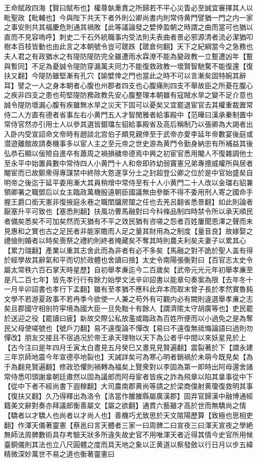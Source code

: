 王命賦政四海【賢曰賦布也】權尊埶重責之所歸若不平心災眚必至誠宜審擇其人以毗聖政【毗輔也】今與陛下共天下者外則公卿尚書内則常侍黄門譬猶一門之内一家之事安則共其福慶危則通其禍敗【此等議論發之嬖倖盈朝之時謂之曲而當可也猶以直而不見容嗚呼】刺史二千石外統職事内受法則夫表曲者景必邪源清者流必潔猶叩樹本百枝皆動也由此言之本朝號令豈可蹉跌【蹉倉何翻】天下之紀綱當今之急務也夫人君之有政猶水之有隄防隄防完全雖遭雨水霖潦不能為變政教一立蹔遭凶年【蹔與暫同】不足為憂誠令隄防穿漏萬夫同力不能復救政教一壞賢智馳騖不能復還【復扶又翻】今隄防雖堅漸有孔穴【諭嬖倖之門也當此之時不可以言漸矣固特婉其辭耳】譬之一人之身本朝者心腹也州郡者四支也心腹痛則四支不舉故臣之所憂在腹心之疾非四支之患也苟堅隄防務政教先安心腹整理本朝雖有寇賊水旱之變不足介意也誠令隄防壞漏心腹有疾雖無水旱之災天下固可以憂矣又宜罷退宦官去其權重裁置常侍二人方直有德者省事左右小黄門五人才智閒雅者給事殿中【范曄曰漢承秦制置中常侍官然亦引用士人以參其選皆銀璫左貂給事殿省及高后稱制乃以張卿為大謁者出入卧内受宣詔命文帝時有趙談北宫伯子頗見親倖至于武帝亦愛李延年帝數宴後庭或潜遊離館故請奏機事多以宦人主之至元帝之世史游為黄門令勤身納忠有所補益其後弘恭石顯以佞險自進卒有蕭周之禍損穢帝德焉中興之初宦官悉用閹人不復雜調他士至永平中始置員數中常侍四人小黄門十人和帝即祚幼弱竇憲兄弟專摠威權所與居者閹宦而已故鄭衆得專謀禁中終除大憝遂享分土之封超登公卿之位於是中官始盛矣自明帝之後迄于延平委用漸大其員稍增中常侍至有十人小黄門二十人改以金璫右貂兼領卿署之職鄧后以女主臨政萬機殷遠朝臣國議無由參斷不得不委用刑人寄之國命手握王爵口銜天憲非復掖庭永巷之職閨牖房闥之任也去羌呂翻省悉景翻】如此則論者厭塞升平可致也【塞悉則翻】扶風功曹馬融對曰今科條品制四時禁令所以承天順民者備矣悉矣不可加矣然而天猶有不平之效民猶有咨嗟之怨者百姓屢聞恩澤之聲而未見惠和之實也古之足民者非能家贍而人足之量其財用為之制度【量音良】故嫁娶之禮儉則婚者以時矣喪祭之禮約則終者掩藏矣不奪其時則農夫利矣夫妻子以累其心【累力瑞翻】產業以重其志舍此而為非者有必不多矣【馬融之對不詭於聖人盖有得於經學故其辭氣和平而切於政體也舍讀曰捨】太史令南陽張衡對曰【百官志太史令屬太常秩六百石掌天時星歷】自初舉孝亷迄今二百歲矣【武帝元光元年初舉孝亷至是凡二百七年】皆先孝行行有餘力始學文法辛卯詔書以能章句奏案為限【去年冬十一月辛卯詔書也孝行下孟翻】雖有至孝猶不應科此弃本而取末曾子長於孝然實魯鈍文學不若游夏政事不若冉季今欲使一人兼之苟外有可觀内必有闕則違選舉孝亷之志矣且郡國守相剖符寜境為國大臣一旦免黜十有餘人【謂濟隂太守胡廣等也】吏民罷於送迎之役【罷讀曰疲】新故交際公私放濫或臨政為百姓所便而以小過免之是為奪民父母使嗟號也【號戶刀翻】易不遠復論不憚改【易曰不遠復無祗悔論語曰過則勿憚改】朋友交接且不宿過况於帝王承天理物以天下為公者乎中間以來妖星見於上【古今注曰是年四月壬寅太白晝見五月癸巳又晝見見賢遍翻】震裂著於下【謂永建三年京師地震今年宣德亭地裂也】天誡詳矣可為寒心明者銷禍於未萌今既見矣【為于為翻見賢遍翻】修政恐懼則禍轉為福矣上覽衆對以李固為第一即時出阿母還舍諸常侍悉叩頭謝辠朝廷肅然以固為議郎而阿母宦者皆疾之詐為飛章以陷其辠事從中下【從中下者不經尚書下遐稼翻】大司農南郡黄尚等請之於梁商僕射黄瓊復救明其事【復扶又翻】久乃得釋出為洛令【洛當作雒雒縣屬廣漢郡】固弃官歸漢中融博通經籍美文辭對奏亦拜議郎衡善屬文【屬之欲翻】通貫六藝雖才高於世而無驕尚之情【驕者以才驕人也尚者以才尚人也】善機巧尤致思於天文隂陽歷算【致極也思相吏翻】作渾天儀著靈憲【蔡邕曰言天體者三家一曰周髀二曰宣夜三曰渾天宣夜之學絶無師法周髀數術具存考驗天狀多所違失故史官不用唯渾天者近得其情今史官所用候臺銅儀則其法也立八尺圓體之度而具天地之象以正黄道以察發斂以行日月以步五緯精微深妙萬世不易之道也衡著靈憲曰